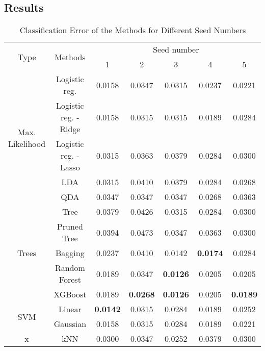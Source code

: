 \subsection{Results}
\begin{table}[htb]
	\caption{Classification Error of the Methods for Different Seed Numbers}
	\begin{center}
		\begin{tabular}{@{} c c c  c c c c @{}}\toprule
			\multirow{2}{*}{Type} & \multirow{2}{*}{Methods} &  \multicolumn{5}{c}{Seed number}\\
			& & 1 & 2 & 3 & 4 & 5 \\
			\midrule
			\multirow{5}{*}{Max. Likelihood} & Logistic reg. & \num{0.0158} & \num{0.0347} & \num{0.0315} & \num{0.0237} & \num{0.0221} \\
			& Logistic reg. - Ridge & \num{0.0158} & \num{0.0315} & \num{0.0315} & \num{0.0189} & \num{0.0284} \\
			& Logistic reg. - Lasso & \num{0.0315} & \num{0.0363} & \num{0.0379} & \num{0.0284} & \num{0.0300} \\
			& LDA & \num{0.0315} & \num{0.0410} & \num{0.0379} & \num{0.0284} & \num{0.0268} \\
			& QDA & \num{0.0347} & \num{0.0347} & \num{0.0347} & \num{0.0268} & \num{0.0363} \\
			\cmidrule{1-7}
			\multirow{5}{*}{Trees} & Tree & \num{0.0379} & \num{0.0426} & \num{0.0315} & \num{0.0284} & \num{0.0300}\\
			& Pruned Tree & \num{0.0394} & \num{0.0473} & \num{0.0347} & \num{0.0363} & \num{0.0300}\\  
			& Bagging & \num{0.0237} & \num{0.0410} & \num{0.0142} & \textbf{\num{0.0174}} & \num{0.0284}\\
			& Random Forest & \num{0.0189} & \num{0.0347} & \textbf{\num{0.0126}} & \num{0.0205} & \num{0.0205}\\
			& XGBoost & \num{0.0189} & \textbf{\num{0.0268}} & \textbf{\num{0.0126}} & \num{0.0205} & \textbf{\num{0.0189}}\\
			\cmidrule{1-7}
			\multirow{2}{*}{SVM} & Linear & \textbf{\num{0.0142}} & \num{0.0315} & \num{0.0284} & \num{0.0189} & \num{0.0252}\\
			& Gaussian & \num{0.0158} & \num{0.0315} & \num{0.0284} & \num{0.0189} & \num{0.0221}\\
			\cmidrule{1-7}
			x & kNN & \num{0.0300} & \num{0.0347} & \num{0.0252} & \num{0.0379} & \num{0.0300}\\
			\bottomrule
			\end{tabular}
			\end{center}
			\label{tab_res_naive}
\end{table}